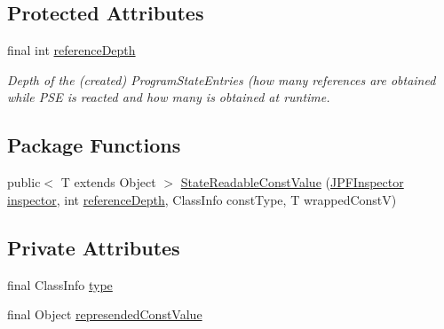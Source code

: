 \subsection*{Protected Attributes}
\begin{DoxyCompactItemize}
\item 
final int \hyperlink{classgov_1_1nasa_1_1jpf_1_1inspector_1_1server_1_1programstate_1_1_state_node_a55683618625dae46e8aa68d95811d6bb}{reference\+Depth}
\begin{DoxyCompactList}\small\item\em Depth of the (created) Program\+State\+Entries (how many references are obtained while P\+SE is reacted and how many is obtained at runtime. \end{DoxyCompactList}\end{DoxyCompactItemize}
\subsection*{Package Functions}
\begin{DoxyCompactItemize}
\item 
public$<$ T extends Object $>$ \hyperlink{classgov_1_1nasa_1_1jpf_1_1inspector_1_1server_1_1programstate_1_1_state_readable_const_value_a75d1dbe2b2dabf1036db1f943a8e5bda}{State\+Readable\+Const\+Value} (\hyperlink{classgov_1_1nasa_1_1jpf_1_1inspector_1_1server_1_1jpf_1_1_j_p_f_inspector}{J\+P\+F\+Inspector} \hyperlink{classgov_1_1nasa_1_1jpf_1_1inspector_1_1server_1_1programstate_1_1_state_node_a26561849632450a4deb53e38716d93c6}{inspector}, int \hyperlink{classgov_1_1nasa_1_1jpf_1_1inspector_1_1server_1_1programstate_1_1_state_node_a55683618625dae46e8aa68d95811d6bb}{reference\+Depth}, Class\+Info const\+Type, T wrapped\+ConstV)
\end{DoxyCompactItemize}
\subsection*{Private Attributes}
\begin{DoxyCompactItemize}
\item 
final Class\+Info \hyperlink{classgov_1_1nasa_1_1jpf_1_1inspector_1_1server_1_1programstate_1_1_state_readable_const_value_aecceaedabb6d497ea088f90bea912c5c}{type}
\item 
final Object \hyperlink{classgov_1_1nasa_1_1jpf_1_1inspector_1_1server_1_1programstate_1_1_state_readable_const_value_a7e85f716b7d7ea2faf2073cf63febc1b}{represended\+Const\+Value}
\end{DoxyCompactItemize}


